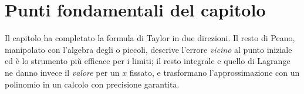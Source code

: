 \section{Punti fondamentali del capitolo}
\label{sec:sintesi-cap10}

Il capitolo ha completato la formula di Taylor in due direzioni. Il resto di Peano,
manipolato con l'algebra degli o piccoli, descrive l'errore \emph{vicino} al punto
iniziale ed è lo strumento più efficace per i limiti; il resto integrale e quello di
Lagrange ne danno invece il \emph{valore} per un $x$ fissato, e trasformano
l'approssimazione con un polinomio in un calcolo con precisione garantita.

